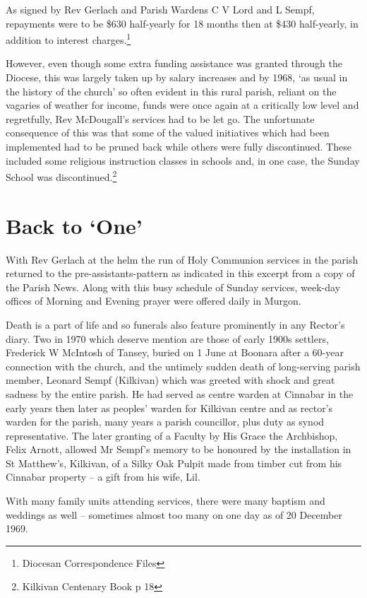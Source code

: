 As signed by Rev Gerlach and Parish Wardens C V Lord and L Sempf,
repayments were to be \$630 half-yearly for 18 months then at \$430
half-yearly, in addition to interest charges.\footnote{Diocesan
  Correspondence Files}

However, even though some extra funding assistance was granted through
the Diocese, this was largely taken up by salary increases and by 1968,
`as usual in the history of the church' so often evident in this rural
parish, reliant on the vagaries of weather for income, funds were once
again at a critically low level and regretfully, Rev McDougall's
services had to be let go. The unfortunate consequence of this was that
some of the valued initiatives which had been implemented had to be
pruned back while others were fully discontinued. These included some
religious instruction classes in schools and, in one case, the Sunday
School was discontinued.\footnote{Kilkivan Centenary Book p 18}

\hypertarget{back-to-one}{%
\section{Back to `One'}\label{back-to-one}}

With Rev Gerlach at the helm the run of Holy Communion services in the
parish returned to the pre-assistants-pattern as indicated in this
excerpt from a copy of the Parish News. Along with this busy schedule of
Sunday services, week-day offices of Morning and Evening prayer were
offered daily in Murgon.

Death is a part of life and so funerals also feature prominently in any
Rector's diary. Two in 1970 which deserve mention are those of early
1900s settlers, Frederick W McIntosh of Tansey, buried on 1 June at
Boonara after a 60-year connection with the church, and the untimely
sudden death of long-serving parish member, Leonard Sempf (Kilkivan)
which was greeted with shock and great sadness by the entire parish. He
had served as centre warden at Cinnabar in the early years then later as
peoples' warden for Kilkivan centre and as rector's warden for the
parish, many years a parish councillor, plus duty as synod
representative. The later granting of a Faculty by His Grace the
Archbishop, Felix Arnott, allowed Mr Sempf's memory to be honoured by
the installation in St Matthew's, Kilkivan, of a Silky Oak Pulpit made
from timber cut from his Cinnabar property -- a gift from his wife, Lil.

With many family units attending services, there were many baptism and
weddings as well -- sometimes almost too many on one day as of 20
December 1969.

